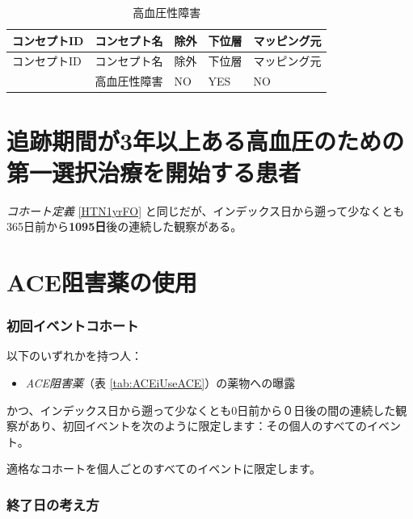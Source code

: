 \documentclass[
  11pt]{book}
\providecommand{\tightlist}{%
  \setlength{\itemsep}{0pt}\setlength{\parskip}{0pt}}
\theoremstyle{definition}
\theoremstyle{definition}
\theoremstyle{definition}
\theoremstyle{definition}
\theoremstyle{remark}
\begin{document}
\begin{longtable}[]{@{}lllll@{}}
\caption{\label{tab:HTN1yrFOHypertensiveDisorder} 高血圧性障害}\tabularnewline
\toprule\noalign{}
コンセプトID & コンセプト名 & 除外 & 下位層 & マッピング元 \\
\midrule\noalign{}
\endfirsthead
\toprule\noalign{}
コンセプトID & コンセプト名 & 除外 & 下位層 & マッピング元 \\
\midrule\noalign{}
\endhead
\bottomrule\noalign{}
\endlastfoot
316866 & 高血圧性障害 & NO & YES & NO \\
\end{longtable}

\section{追跡期間が3年以上ある高血圧のための第一選択治療を開始する患者}\label{HTN3yrFO}

\emph{コホート定義} \ref{HTN1yrFO} と同じだが、インデックス日から遡って少なくとも365日前から\textbf{1095日}後の連続した観察がある。

\section{ACE阻害薬の使用}\label{ACEiUse}

\subsubsection*{初回イベントコホート}\label{ux521dux56deux30a4ux30d9ux30f3ux30c8ux30b3ux30dbux30fcux30c8-6}

以下のいずれかを持つ人：

\begin{itemize}
\tightlist
\item
  \emph{ACE阻害薬}（表 \ref{tab:ACEiUseACE}）の薬物への曝露
\end{itemize}

かつ、インデックス日から遡って少なくとも0日前から０日後の間の連続した観察があり、初回イベントを次のように限定します：その個人のすべてのイベント。

適格なコホートを個人ごとのすべてのイベントに限定します。

\subsubsection*{終了日の考え方}\label{ux7d42ux4e86ux65e5ux306eux8003ux3048ux65b9-6}
\end{document}
